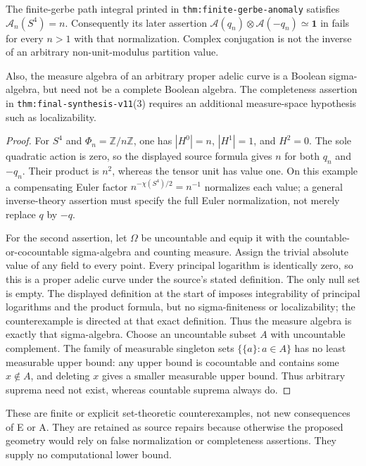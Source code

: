 \begin{proposition}
The finite-gerbe path integral printed in
\texttt{thm:finite-gerbe-anomaly} satisfies
$\mathcal A_n(S^4)=n$. Consequently its later assertion
$\mathcal A(q_n)\otimes\mathcal A(-q_n)\simeq\mathbf1$
in  fails for every $n>1$ with
that normalization. Complex conjugation is not the inverse of an
arbitrary non-unit-modulus partition value.

Also, the measure algebra of an arbitrary proper adelic curve is a
Boolean sigma-algebra, but need not be a complete Boolean algebra.
The completeness assertion in \texttt{thm:final-synthesis-v11}(3)
requires an additional measure-space hypothesis such as localizability.
\end{proposition}
\begin{proof}
For $S^4$ and $\Phi_n=\mathbb Z/n\mathbb Z$, one has
$|H^0|=n$, $|H^1|=1$, and $H^2=0$. The sole quadratic action is zero,
so the displayed source formula gives $n$ for both $q_n$ and $-q_n$.
Their product is $n^2$, whereas the tensor unit has value one. On this
example a compensating Euler factor $n^{-\chi(S^4)/2}=n^{-1}$
normalizes each value; a general inverse-theory assertion must specify
the full Euler normalization, not merely replace $q$ by $-q$.

For the second assertion, let $\Omega$ be uncountable and equip it
with the countable-or-cocountable sigma-algebra and counting measure.
Assign the trivial absolute value of any field to every point.
Every principal logarithm is identically zero, so this is a proper
adelic curve under the source's stated definition. The only null set
is empty. The displayed definition at the start of
 imposes integrability of principal
logarithms and the product formula, but no sigma-finiteness or
localizability; the counterexample is directed at that exact definition.
Thus the measure algebra
is exactly that sigma-algebra.
Choose an uncountable subset $A$ with uncountable complement. The
family of measurable singleton sets $\{\{a\}:a\in A\}$ has no
least measurable upper bound: any upper bound is cocountable and
contains some $x\notin A$, and deleting $x$ gives a smaller measurable
upper bound. Thus arbitrary suprema need not exist, whereas countable
suprema always do.
\end{proof}

These are finite or explicit set-theoretic counterexamples, not new
consequences of E or A. They are retained as source repairs because
otherwise the proposed geometry would rely on false normalization or
completeness assertions. They supply no computational lower bound.

